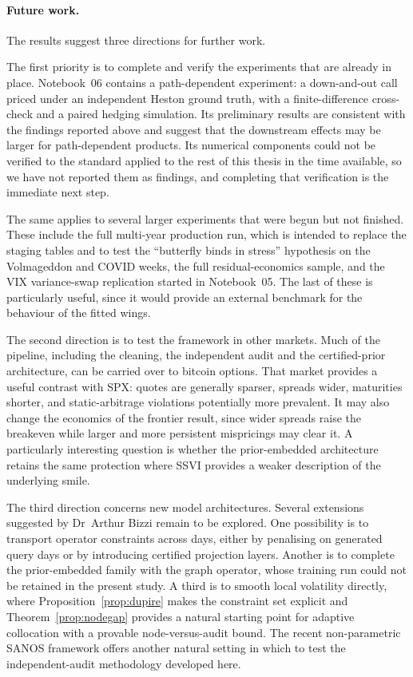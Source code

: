 \paragraph{Future work.} The results suggest three directions for further work.

The first priority is to complete and verify the experiments that are already in place.
Notebook~06 contains a path-dependent experiment: a down-and-out call priced under an
independent Heston ground truth, with a finite-difference cross-check and a paired hedging
simulation. Its preliminary results are consistent with the findings reported above and suggest
that the downstream effects may be larger for path-dependent products. Its numerical components
could not be verified to the standard applied to the rest of this thesis in the time available,
so we have not reported them as findings, and completing that verification is the immediate next
step.

The same applies to several larger experiments that were begun but not finished. These include
the full multi-year production run, which is intended to replace the staging tables and to test the
``butterfly binds in stress'' hypothesis on the Volmageddon and COVID weeks, the full
residual-economics sample, and the VIX variance-swap replication started in Notebook~05. The
last of these is particularly useful, since it would provide an external benchmark for the
behaviour of the fitted wings.

The second direction is to test the framework in other markets. Much of the pipeline, including
the cleaning, the independent audit and the certified-prior architecture, can be carried over to
bitcoin options. That market provides a useful contrast with SPX: quotes are generally sparser,
spreads wider, maturities shorter, and static-arbitrage violations potentially more prevalent.
It may also change the economics of the frontier result, since wider spreads raise the breakeven
while larger and more persistent mispricings may clear it. A particularly interesting question
is whether the prior-embedded architecture retains the same protection where SSVI provides a
weaker description of the underlying smile.

The third direction concerns new model architectures. Several extensions suggested by
Dr~Arthur Bizzi remain to be explored. One possibility is to transport operator constraints
across days, either by penalising on generated query days or by introducing certified projection
layers. Another is to complete the prior-embedded family with the graph operator, whose training
run could not be retained in the present study. A third is to smooth local volatility directly,
where Proposition~\ref{prop:dupire} makes the constraint set explicit and
Theorem~\ref{prop:nodegap} provides a natural starting point for adaptive collocation with a
provable node-versus-audit bound. The recent non-parametric SANOS framework \cite{sanos2026}
offers another natural setting in which to test the independent-audit methodology developed
here.